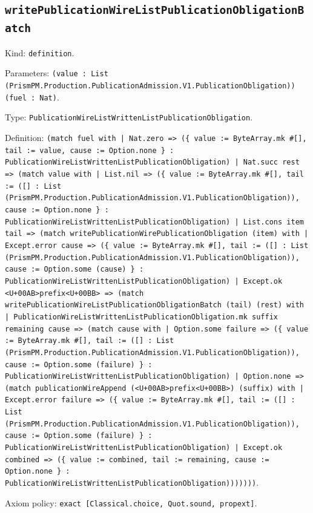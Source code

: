 \documentclass[11pt]{article}
\begin{document}
\subsection*{\texttt{writePublicationWireListPublicationObligationBatch}}
\noindent Kind: \texttt{definition}.\par
\noindent Parameters: \texttt{(value : List (PrismPM.Production.PublicationAdmission.V1.PublicationObligation)) (fuel : Nat)}.\par
\noindent Type: \texttt{PublicationWireListWrittenListPublicationObligation}.\par
\noindent Definition: \texttt{(match fuel with | Nat.zero => (\{ value := ByteArray.mk \#[], tail := value, cause := Option.none \} : PublicationWireListWrittenListPublicationObligation) | Nat.succ rest => (match value with | List.nil => (\{ value := ByteArray.mk \#[], tail := ([] : List (PrismPM.Production.PublicationAdmission.V1.PublicationObligation)), cause := Option.none \} : PublicationWireListWrittenListPublicationObligation) | List.cons item tail => (match writePublicationWirePublicationObligation (item) with | Except.error cause => (\{ value := ByteArray.mk \#[], tail := ([] : List (PrismPM.Production.PublicationAdmission.V1.PublicationObligation)), cause := Option.some (cause) \} : PublicationWireListWrittenListPublicationObligation) | Except.ok <U+00AB>prefix<U+00BB> => (match writePublicationWireListPublicationObligationBatch (tail) (rest) with | PublicationWireListWrittenListPublicationObligation.mk suffix remaining cause => (match cause with | Option.some failure => (\{ value := ByteArray.mk \#[], tail := ([] : List (PrismPM.Production.PublicationAdmission.V1.PublicationObligation)), cause := Option.some (failure) \} : PublicationWireListWrittenListPublicationObligation) | Option.none => (match publicationWireAppend (<U+00AB>prefix<U+00BB>) (suffix) with | Except.error failure => (\{ value := ByteArray.mk \#[], tail := ([] : List (PrismPM.Production.PublicationAdmission.V1.PublicationObligation)), cause := Option.some (failure) \} : PublicationWireListWrittenListPublicationObligation) | Except.ok combined => (\{ value := combined, tail := remaining, cause := Option.none \} : PublicationWireListWrittenListPublicationObligation)))))))}.\par
\noindent Axiom policy: \texttt{exact [Classical.choice, Quot.sound, propext]}.\par
\end{document}

